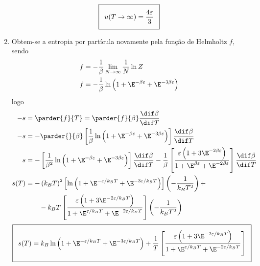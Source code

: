 \begin{prob}
\begin{sol}
\begin{enumerate}[label=\alph *)]
      \begin{align}
        \addtolength{\fboxsep}{5pt}
        \boxed{
          \begin{gathered}
            u(T\to\infty)=\frac{4\varepsilon}{3}
          \end{gathered}
        }
      \end{align}
      \item Obtem-se a entropia por partícula novamente pela função de Helmholtz $f$, sendo
      \begin{align}
        \begin{split}
          f&=-\frac{1}{\beta}\lim_{N\to\infty}\frac{1}{N}\ln Z\\
          f&=-\frac{1}{\beta}\ln\left(1+\E^{-\beta\varepsilon}+\E^{-3\beta\varepsilon}\right)
        \end{split}
      \end{align}
      logo
      \begin{align}
        \begin{split}
          -s&=\parder{f}{T}=\parder{f}{\beta}\frac{\dif\beta}{\dif T}\\
          -s&=-\parder{}{\beta}\left[\frac{1}{\beta}\ln\left(1+\E^{-\beta\varepsilon}+\E^{-3\beta\varepsilon}\right)\right]\frac{\dif\beta}{\dif T}\\
          s&=-\left[\frac{1}{\beta^2}\ln\left(1+\E^{-\beta\varepsilon}+\E^{-3\beta\varepsilon}\right)\right]\frac{\dif\beta}{\dif T}-\frac{1}{\beta}\left[\frac{\varepsilon\left(1+3\E^{-2\beta\varepsilon}\right)}{1+\E^{\beta\varepsilon}+\E^{-2\beta\varepsilon}}\right]\frac{\dif\beta}{\dif T}\\
          s(T)&=-\left(k_BT\right)^2\left[\ln\left(1+\E^{-\varepsilon/k_BT}+\E^{-3\varepsilon/k_BT}\right)\right]\left(-\frac{1}{k_BT^2}\right)+\\
          &\qquad-k_BT\left[\frac{\varepsilon\left(1+3\E^{-2\varepsilon/k_BT}\right)}{1+\E^{\varepsilon/k_BT}+\E^{-2\varepsilon/k_BT}}\right]\left(-\frac{1}{k_BT^2}\right)
        \end{split}
      \end{align}
      \begin{align}
        \label{eq:entropia-prob3}
        \addtolength{\fboxsep}{5pt}
        \boxed{
          \begin{gathered}
            s(T)=k_B\ln\left(1+\E^{-\varepsilon/k_BT}+\E^{-3\varepsilon/k_BT}\right)+\frac{1}{T}\left[\frac{\varepsilon\left(1+3\E^{-2\varepsilon/k_BT}\right)}{1+\E^{\varepsilon/k_BT}+\E^{-2\varepsilon/k_BT}}\right]

\end{gathered}}
\end{align}
\end{enumerate}
\end{sol}
\end{prob}
